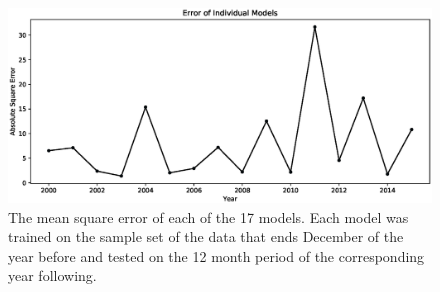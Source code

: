 \documentclass[12pt]{dalthesis}
\begin{document}
\begin{figure}
	\includegraphics[width=\columnwidth]{errorplot}
    \caption{The mean square error of each of the 17 models. Each model was trained on the sample set of the data that ends December of the year before and tested on the 12 month period of the corresponding year following.}
    \label{fig:allyearerror}
\end{figure}
\end{document}
